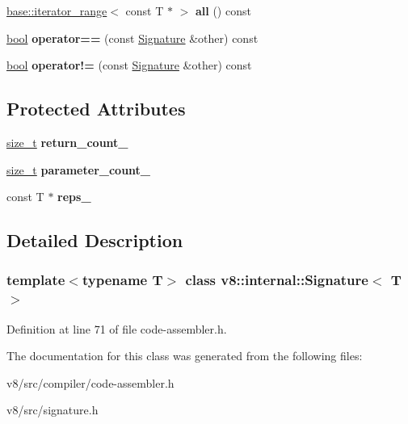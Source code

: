 \begin{DoxyCompactItemize}
\mbox{\hyperlink{classv8_1_1base_1_1iterator__range}{base\+::iterator\+\_\+range}}$<$ const T $\ast$ $>$ {\bfseries all} () const
\item 
\mbox{\label{classv8_1_1internal_1_1Signature_ae25b269492033e0f51f4643dd463e5f4}} 
\mbox{\hyperlink{classbool}{bool}} {\bfseries operator==} (const \mbox{\hyperlink{classv8_1_1internal_1_1Signature}{Signature}} \&other) const
\item 
\mbox{\label{classv8_1_1internal_1_1Signature_ade4534714875e0b0c752e88a45d5d47f}} 
\mbox{\hyperlink{classbool}{bool}} {\bfseries operator!=} (const \mbox{\hyperlink{classv8_1_1internal_1_1Signature}{Signature}} \&other) const
\end{DoxyCompactItemize}
\subsection*{Protected Attributes}
\begin{DoxyCompactItemize}
\item 
\mbox{\label{classv8_1_1internal_1_1Signature_a8f5f81d1ef9973b9dd0a6cd507c4e126}} 
\mbox{\hyperlink{classsize__t}{size\+\_\+t}} {\bfseries return\+\_\+count\+\_\+}
\item 
\mbox{\label{classv8_1_1internal_1_1Signature_a6fb4fac70d94fe8a4439ca3ba0bc2873}} 
\mbox{\hyperlink{classsize__t}{size\+\_\+t}} {\bfseries parameter\+\_\+count\+\_\+}
\item 
\mbox{\label{classv8_1_1internal_1_1Signature_abe8890ba72e64de0ecfba69324f694fc}} 
const T $\ast$ {\bfseries reps\+\_\+}
\end{DoxyCompactItemize}


\subsection{Detailed Description}
\subsubsection*{template$<$typename T$>$\newline
class v8\+::internal\+::\+Signature$<$ T $>$}



Definition at line 71 of file code-\/assembler.\+h.



The documentation for this class was generated from the following files\+:\begin{DoxyCompactItemize}
\item 
v8/src/compiler/code-\/assembler.\+h\item 
v8/src/signature.\+h\end{DoxyCompactItemize}
